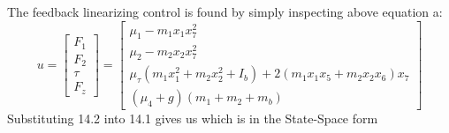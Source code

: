 \documentclass{UoNMCHA}
\numberwithin{equation}{section}
\begin{document}
	
	The feedback linearizing control is found by simply inspecting above equation a:
	$$
	u=\left[\begin{array}{c}
	F_{1} \\
	F_{2} \\
	\tau \\
	F_{z}
	\end{array}\right]=\left[\begin{array}{c}
	\mu_{1}-m_{1} x_{1} x_{7}^{2} \\
	\mu_{2}-m_{2} x_{2} x_{7}^{2} \\
	\mu_{\tau}\left(m_{1} x_{1}^{2}+m_{2} x_{2}^{2}+I_{b}\right)+2\left(m_{1} x_{1} x_{5}+m_{2} x_{2} x_{6}\right) x_{7} \\
	\left(\mu_{4}+g\right)\left(m_{1}+m_{2}+m_{b}\right)
	\end{array}\right]
	$$
	Substituting 14.2 into 14.1 gives us which is in the State-Space form
\end{document}

